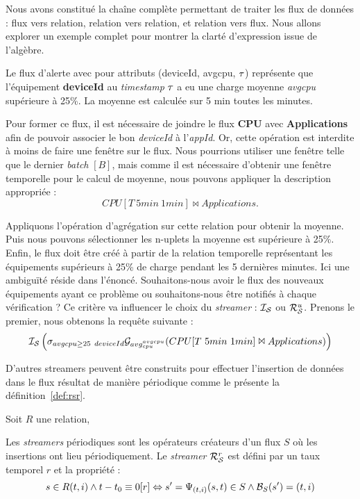 Nous avons constitué la chaîne complète permettant de traiter les flux de données : flux vers relation, relation vers relation, et relation vers flux. Nous allons explorer un exemple complet pour montrer la clarté d'expression issue de l'algèbre.

\begin{example}
    Le flux d'alerte avec pour attributs (deviceId, avgcpu, $\tau$) représente que l'équipement \textbf{deviceId} au \textit{timestamp} $\tau$ a eu une charge moyenne \textit{avgcpu} supérieure à 25\%. La moyenne est calculée sur 5 min toutes les minutes.

    Pour former ce flux, il est nécessaire de joindre le flux \textbf{CPU} avec \textbf{Applications} afin de pouvoir associer le bon \textit{deviceId} à l'\textit{appId}. Or, cette opération est interdite à moins de faire une fenêtre sur le flux. Nous pourrions utiliser une fenêtre telle que le dernier \textit{batch} $[B]$, mais comme il est nécessaire d'obtenir une fenêtre temporelle pour le calcul de moyenne, nous pouvons appliquer la description appropriée : $$CPU[T\ 5min\ 1min]\Join Applications.$$

    Appliquons l'opération d'agrégation sur cette relation pour obtenir la moyenne. Puis nous pouvons sélectionner les n-uplets la moyenne est supérieure à 25\%. Enfin, le flux doit être créé à partir de la relation temporelle représentant les équipements supérieurs à 25\% de charge pendant les 5 dernières minutes. Ici une ambiguïté réside dans l'énoncé. Souhaitons-nous avoir le flux des nouveaux équipements ayant ce problème ou souhaitons-nous être notifiés à chaque vérification ? Ce critère va influencer le choix du \textit{streamer} : $\mathcal{I_S}$ ou $\mathcal{R}_{\mathcal S}^{u}$. Prenons le premier, nous obtenons la requête suivante : 
    $$\IS\left(\sigma_{avgcpu \geq 25} \ \null_{deviceId}\G_{avg_{cpu}^{avgcpu}} (CPU[T\ 5min\ 1min]\Join Applications)\right)$$
\end{example}

D'autres streamers peuvent être construits pour effectuer l'insertion de données dans le flux résultat de manière périodique comme le présente la définition~\ref{def:rsr}.
\begin{defi}\label{def:rsr}
    Soit $R$ une relation,

    Les \textit{streamers} périodiques sont les opérateurs créateurs d'un flux $S$ où les insertions ont lieu périodiquement. Le \textit{streamer} $\mathcal{R}_{\mathcal S}^{r}$ est défini par un taux temporel $r$ et la propriété :
$$s\in R(t,i) \wedge t-t_0\equiv 0[r]\Leftrightarrow s'=\Psi_{(t,i)}(s,t)\in S \wedge \mathcal{B}_S(s') = (t,i)$$
\end{defi}

